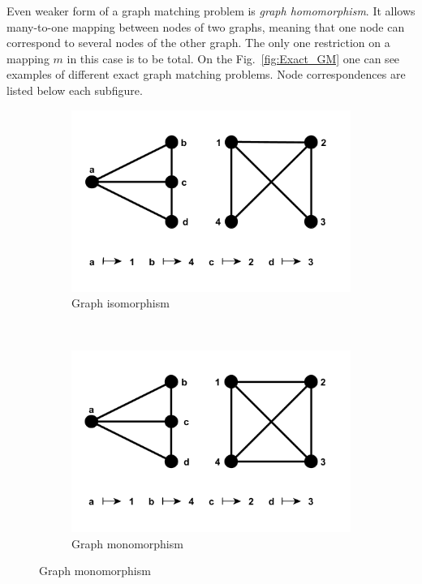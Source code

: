Even weaker form of a graph matching problem is \emph{graph homomorphism}. It allows many-to-one mapping between nodes of two graphs, meaning that one node can correspond to several nodes of the other graph. The only one restriction on a mapping $m$ in this case is to be total.
On the Fig.~\ref{fig:Exact_GM} one can see examples of different exact graph matching problems. Node correspondences are listed below each subfigure.
\begin{figure}[h!]
    \centering
    \begin{subfigure}[b]{0.3\textwidth}
        \includegraphics[width=\textwidth]{chapter1/fig/GI}
        \caption{Graph isomorphism}
        \label{fig:GI}
    \end{subfigure}
    ~
    \begin{subfigure}[b]{0.3\textwidth}
        \includegraphics[width=\textwidth]{chapter1/fig/monomorphism}
        \caption{Graph monomorphism}
        \label{fig:monomorphism}

\end{subfigure}
\end{figure}
